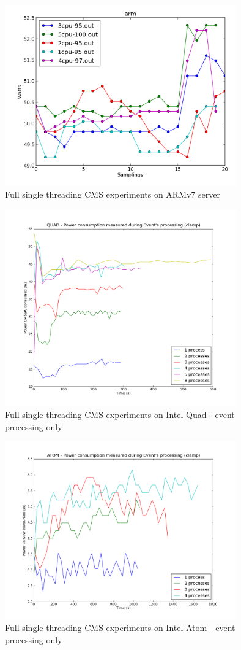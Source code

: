 \begin{figure}[h!]
  \centering
    \includegraphics[width=100mm]{"img/aalto/aalto_total_arm"}
    \caption{Full single threading CMS experiments on ARMv7 server}
    \label{fig:aalto_arm_clamp}
\end{figure}


\begin{figure}[h!]
  \centering
    \includegraphics[width=100mm]{"img/aalto/aalto_quadEvents"}
    \caption{Full single threading CMS experiments on Intel Quad - event
    \label{fig:aalto_quad_events}
processing only}
\end{figure}

\begin{figure}[h!]
  \centering
    \includegraphics[width=100mm]{"img/aalto/aalto_atomEvents"}
    \caption{Full single threading CMS experiments on Intel Atom - event
    \label{fig:aalto_atom_events}
processing only}
\end{figure}


